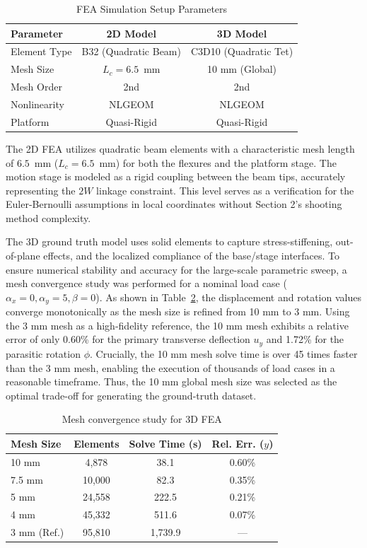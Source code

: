 \documentclass[colorlinks,upint,subscriptcorrection,varvw,hyphenate,balance]{asmeconf} %
\begin{document}
\begin{table}[ht]
\centering
\caption{FEA Simulation Setup Parameters}
\label{tab:fea_setup}
\begin{tabular}{lcc}
\toprule
\textbf{Parameter} & \textbf{2D Model} & \textbf{3D Model} \\
\midrule
Element Type & B32 (Quadratic Beam) & C3D10 (Quadratic Tet) \\
Mesh Size & $L_c = 6.5$~mm & 10 mm (Global) \\
Mesh Order & 2nd & 2nd \\
Nonlinearity & NLGEOM & NLGEOM \\
Platform &  Quasi-Rigid & Quasi-Rigid \\
\bottomrule
\end{tabular}
\end{table}

The 2D FEA utilizes quadratic beam elements with a characteristic mesh length of $6.5$~mm ($L_c = 6.5$~mm) for both the flexures and the platform stage. The motion stage is modeled as a rigid coupling between the beam tips, accurately representing the $2W$ linkage constraint. This level serves as a verification for the Euler-Bernoulli assumptions in local coordinates without Section 2's shooting method complexity.

The 3D ground truth model uses solid elements to capture stress-stiffening, out-of-plane effects, and the localized compliance of the base/stage interfaces. To ensure numerical stability and accuracy for the large-scale parametric sweep, a mesh convergence study was performed for a nominal load case ($\alpha_x = 0, \alpha_y = 5, \beta = 0$). As shown in Table~\ref{tab:mesh_convergence}, the displacement and rotation values converge monotonically as the mesh size is refined from 10 mm to 3 mm. Using the 3 mm mesh as a high-fidelity reference, the 10 mm mesh exhibits a relative error of only 0.60\% for the primary transverse deflection $u_y$ and 1.72\% for the parasitic rotation $\phi$. Crucially, the 10 mm mesh solve time is over 45 times faster than the 3 mm mesh, enabling the execution of thousands of load cases in a reasonable timeframe. Thus, the 10 mm global mesh size was selected as the optimal trade-off for generating the ground-truth dataset.

\begin{table}[ht]
\centering
\caption{Mesh convergence study for 3D FEA}
\label{tab:mesh_convergence}
\begin{tabular}{lccc}
\toprule
\textbf{Mesh Size} & \textbf{Elements} & \textbf{Solve Time (s)} & \textbf{Rel. Err. ($y$)} \\
\midrule
10 mm & 4,878 & 38.1 & 0.60\% \\
7.5 mm & 10,000 & 82.3 & 0.35\% \\
5 mm & 24,558 & 222.5 & 0.21\% \\
4 mm & 45,332 & 511.6 & 0.07\% \\
3 mm (Ref.) & 95,810 & 1,739.9 & --- \\
\bottomrule
\end{tabular}
\end{table}
\end{document}
